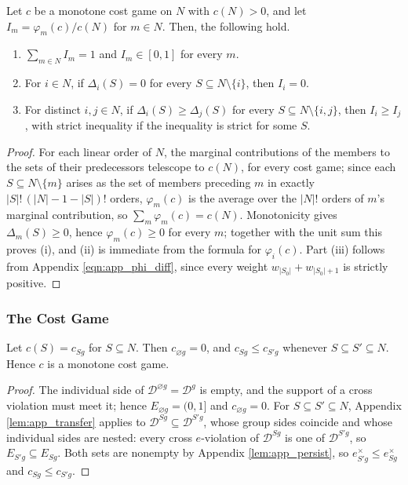 \documentclass[11 pt]{article}
\begin{document}
\begin{lemma}\label{lem:app_shares}
Let $c$ be a monotone cost game on $N$ with $c(N) > 0$, and let $I_{m} = \varphi_{m}(c)/c(N)$ for $m \in N$. Then, the following hold.
\begin{enumerate}
\item[(i)] $\sum_{m \in N} I_{m} = 1$ and $I_{m} \in [0,1]$ for every $m$.
\item[(ii)] For $i \in N$, if $\Delta_{i}(S) = 0$ for every $S \subseteq N \setminus \{i\}$, then $I_{i} = 0$.
\item[(iii)] For distinct $i, j \in N$, if $\Delta_{i}(S) \geq \Delta_{j}(S)$ for every $S \subseteq N \setminus \{i,j\}$, then $I_{i} \geq I_{j}$, with strict inequality if the inequality is strict for some $S$.
\end{enumerate}
\end{lemma}

\begin{proof}
For each linear order of $N$, the marginal contributions of the members to the sets of their predecessors telescope to $c(N)$, for every cost game; since each $S \subseteq N \setminus \{m\}$ arises as the set of members preceding $m$ in exactly $|S|!\,(|N|-1-|S|)!$ orders, $\varphi_{m}(c)$ is the average over the $|N|!$ orders of $m$'s marginal contribution, so $\sum_{m} \varphi_{m}(c) = c(N)$. Monotonicity gives $\Delta_{m}(S) \geq 0$, hence $\varphi_{m}(c) \geq 0$ for every $m$; together with the unit sum this proves (i), and (ii) is immediate from the formula for $\varphi_{i}(c)$. Part (iii) follows from Appendix \autoref{eqn:app_phi_diff}, since every weight $w_{|S_0|} + w_{|S_0|+1}$ is strictly positive.
\end{proof}

\subsubsection{The Cost Game}\label{subsec:app_lemgame}

\begin{lemma}\label{lem:game}
Let $c(S) = c_{Sg}$ for $S \subseteq N$. Then $c_{\varnothing g} = 0$, and $c_{Sg} \leq c_{S'g}$ whenever $S \subseteq S' \subseteq N$. Hence $c$ is a monotone cost game.
\end{lemma}

\begin{proof}
The individual side of $\mathcal{D}^{\varnothing g} = \mathcal{D}^{g}$ is empty, and the support of a cross violation must meet it; hence $E_{\varnothing g} = (0,1]$ and $c_{\varnothing g} = 0$. For $S \subseteq S' \subseteq N$, Appendix \autoref{lem:app_transfer} applies to $\mathcal{D}^{Sg} \subseteq \mathcal{D}^{S'g}$, whose group sides coincide and whose individual sides are nested: every cross $e$-violation of $\mathcal{D}^{Sg}$ is one of $\mathcal{D}^{S'g}$, so $E_{S'g} \subseteq E_{Sg}$. Both sets are nonempty by Appendix \autoref{lem:app_persist}, so $e^{\times}_{S'g} \leq e^{\times}_{Sg}$ and $c_{Sg} \leq c_{S'g}$.
\end{proof}
\end{document}
